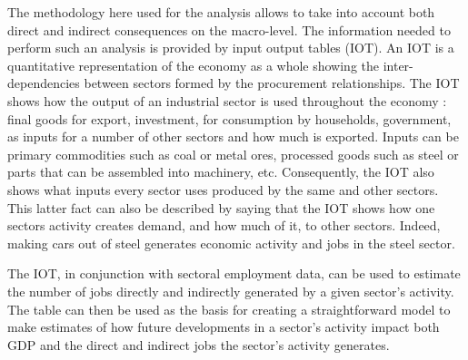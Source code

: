 \documentclass[12pt,english]{article}
\begin{document}


The methodology here used for the analysis allows to take into account both direct and indirect consequences on the macro-level. The information needed to perform such an analysis is provided by input output tables (IOT). %
An IOT is a quantitative representation of the economy as a whole showing the inter-dependencies between sectors formed by the procurement relationships. %
The IOT shows how the output of an industrial sector is used throughout the economy : final goods for export, investment, for consumption by households, government, as inputs for a number of other sectors and how much is exported. Inputs can be primary commodities such as coal or metal ores, processed goods such as steel or parts that can be assembled into machinery, etc. Consequently, the IOT also shows what inputs every sector uses produced by the same and other sectors. This latter fact can also be described by saying that the IOT shows how one sectors activity creates demand, and how much of it, to other sectors. Indeed, making cars out of steel generates economic activity and jobs in the steel sector. 

The IOT, in conjunction with sectoral employment data, can be used to estimate the number of jobs directly and indirectly generated by a given sector's activity. The table can then be used as the basis for creating a straightforward model to make estimates of how future developments in a sector's activity impact both GDP and the direct and indirect jobs the sector's activity generates.
\end{document}
